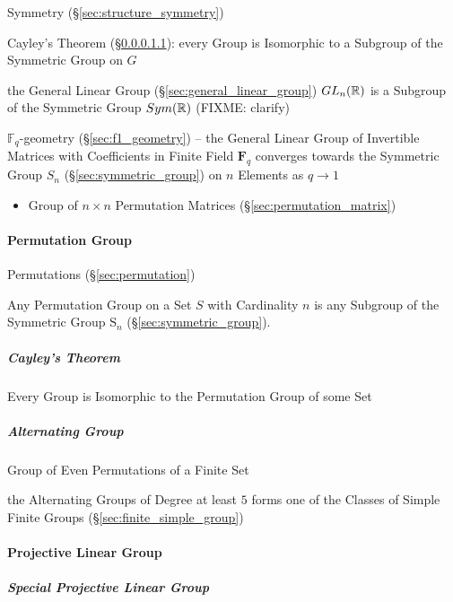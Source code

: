 Symmetry (\S\ref{sec:structure_symmetry})

Cayley's Theorem (\S\ref{sec:cayleys_theorem}): every Group is
Isomorphic to a Subgroup of the Symmetric Group on $G$

\fist the General Linear Group (\S\ref{sec:general_linear_group})
$GL_n(\mathbb{R})$ is a Subgroup of the Symmetric Group $Sym(\mathbb{R})$ (FIXME:
clarify)

\fist $\mathbb{F}_q$-geometry (\S\ref{sec:f1_geometry}) -- the General Linear
Group of Invertible Matrices with Coefficients in Finite Field $\mathbf{F}_q$
converges towards the Symmetric Group $S_n$ (\S\ref{sec:symmetric_group}) on $n$
Elements as $q \rightarrow 1$

\begin{itemize}
  \item Group of $n \times n$ Permutation Matrices
    (\S\ref{sec:permutation_matrix})
\end{itemize}



\paragraph{Permutation Group}\label{sec:permutation_group}\hfill

Permutations (\S\ref{sec:permutation})

Any Permutation Group on a Set $S$ with Cardinality $n$ is any
Subgroup of the Symmetric Group $\mathrm{S}_n$
(\S\ref{sec:symmetric_group}).



\subparagraph{Cayley's Theorem}\label{sec:cayleys_theorem}\hfill

Every Group is Isomorphic to the Permutation Group of some Set



\subparagraph{Alternating Group}\label{sec:alternating_group}\hfill

Group of Even Permutations of a Finite Set

the Alternating Groups of Degree at least $5$ forms one of the Classes of Simple
Finite Groups (\S\ref{sec:finite_simple_group})



\paragraph{Projective Linear Group}\label{sec:projective_linear_group}\hfill

\subparagraph{Special Projective Linear Group}
\label{sec:special_projective_linear_group}\hfill




